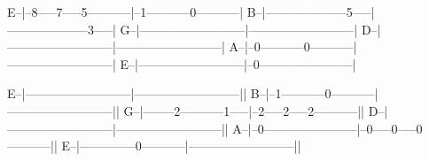 \begin{lsttab}
E--|--8-----7-----5-----------|--1-----------0-----------|
B--|--------------------5-----|--------------------3-----|
G--|--------------------------|--------------------------|
D--|--------------------------|--------------------------|
A--|--0-----------0-----------|--------------------------|
E--|--------------------------|--0-----------------------|

E--|--------------------------|--------------------------||
B--|--1-----------0-----------|--------------------------||
G--|--------2-----------1-----|--2-----2-----2-----------||
D--|--------------------------|--------------------------||
A--|--0-----------------------|--0-----0-----0-----------||
E--|--------------0-----------|--------------------------||
\end{lsttab}
\newpage

